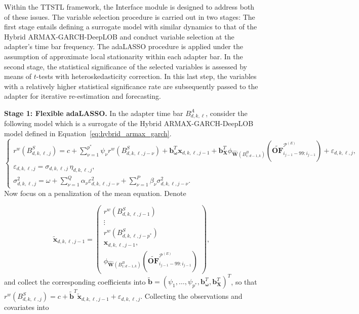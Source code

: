\documentclass[10pt,a4paper,oneside]{article}
\begin{document}
Within the TTSTL framework, the Interface module is designed to address both of these issues. The variable selection procedure is carried out in two stages: The first stage entails defining a surrogate model with similar dynamics to that of the Hybrid ARMAX-GARCH-DeepLOB and conduct variable selection at the adapter's time bar frequency. The adaLASSO procedure is applied under the assumption of approximate local stationarity within each adapter bar. In the second stage, the statistical significance of the selected variables is assessed by means of \(t\)-tests with heteroskedasticity correction. In this last step, the variables with a relatively higher statistical significance rate are subsequently passed to the adapter for iterative re-estimation and forecasting.
\medskip

\noindent\textbf{Stage 1: Flexible adaLASSO.}  In the adapter time bar $B^A_{d, k, \ell}$, consider the following model which is a surrogate of the Hybrid ARMAX-GARCH-DeepLOB model defined in Equation~\eqref{eq:hybrid_armax_garch}.
\begin{equation}
    \begin{cases}
        r^w\left( B^S_{d, k, \ell, j} \right) = c + \sum^{p^*}_{\nu = 1} \psi_{\nu} r^w \left( B^S_{d, k, \ell, j - \nu} \right) + \mathbf{b}_{\boldsymbol{\omega}}^T \mathbf{x}_{d, k, \ell, j - 1} + \mathbf{b}^T_{\mathbf{X}}\phi_{\hat{\mathbf{W}}\left( B^B_{1:d - 1, k} \right)} \left( \widetilde{\mathbf{OF}}^{\mathcal{P}^{(E)}}_{i_{j - 1} - 99:i_{j - 1}} \right) + \varepsilon_{d, k, \ell, j}, \\[6pt]
        \varepsilon_{d, k, \ell, j} = \sigma_{d, k, \ell, j} \,\eta_{d, k, \ell, j},\\[6pt]
        \sigma_{d, k, \ell, j}^2 = \omega + \sum^{Q}_{\nu = 1} \alpha_{\nu} \varepsilon^2_{d, k, \ell, j - \nu} + \sum^P_{\nu = 1} \beta_{\nu} \sigma_{d, k, \ell, j - \nu}^2.
    \end{cases}
    \label{eq:surrogate}
\end{equation}
Now focus on a penalization of the mean equation.  Denote

\[
    \tilde{\mathbf{x}}_{d,k,\ell,j - 1}
    =
    \begin{pmatrix}
        r^w \left( B^S_{d, k, \ell, j - 1} \right)   \\
        \vdots                                       \\
        r^w \left( B^S_{d, k, \ell, j - p^*} \right) \\
        \mathbf{x}_{d, k, \ell, j - 1},              \\
        \phi_{\hat{\mathbf{W}}\left( B^B_{1:d - 1, k} \right)}\left( \widetilde{\mathbf{OF}}^{\mathcal{P}^{(E)}}_{i_{j - 1} - 99:i_{j - 1}} \right)
    \end{pmatrix},
\]
and collect the corresponding coefficients into \(\tilde{\mathbf{b}} = \left( \psi_1, \dots, \psi_{p^*}, \mathbf{b}^T_{\boldsymbol{\omega}}, \mathbf{b}^T_{\mathbf{X}}\right)^T\), so that \(r^w\left( B^S_{d,k,\ell,j} \right) = c + \tilde{\mathbf{b}}^T\tilde{\mathbf{x}}_{d, k, \ell, j - 1} + \varepsilon_{d,k,\ell, j}\). Collecting the observations and covariates into
\end{document}
